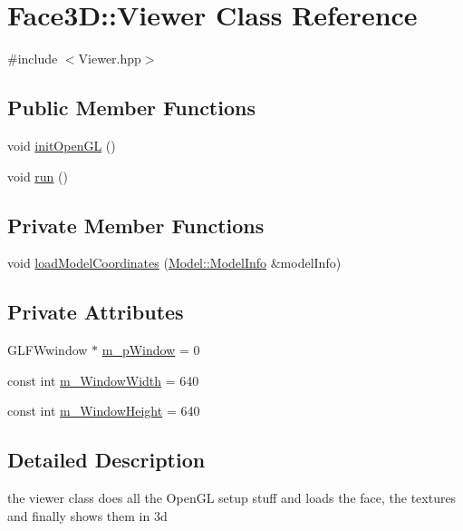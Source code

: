 \hypertarget{class_face3_d_1_1_viewer}{}\section{Face3D\+:\+:Viewer Class Reference}
\label{class_face3_d_1_1_viewer}


{\ttfamily \#include $<$Viewer.\+hpp$>$}

\subsection*{Public Member Functions}
\begin{DoxyCompactItemize}
\item 
void \hyperlink{class_face3_d_1_1_viewer_aa573a82494448874e4ed94f6cd4ed337}{init\+Open\+GL} ()
\item 
void \hyperlink{class_face3_d_1_1_viewer_a044ac30ff04ca0b145753adce39f53f4}{run} ()
\end{DoxyCompactItemize}
\subsection*{Private Member Functions}
\begin{DoxyCompactItemize}
\item 
void \hyperlink{class_face3_d_1_1_viewer_ac4e14d93256535503e5b16866b03f4e1}{load\+Model\+Coordinates} (\hyperlink{struct_face3_d_1_1_model_1_1_model_info}{Model\+::\+Model\+Info} \&model\+Info)
\end{DoxyCompactItemize}
\subsection*{Private Attributes}
\begin{DoxyCompactItemize}
\item 
G\+L\+F\+Wwindow $\ast$ \hyperlink{class_face3_d_1_1_viewer_aa0a9660c0c04a81a2ea3bfdffae5d301}{m\+\_\+p\+Window} = 0
\item 
const int \hyperlink{class_face3_d_1_1_viewer_abf178984caeed65a69fcf7f0073147f4}{m\+\_\+\+Window\+Width} = 640
\item 
const int \hyperlink{class_face3_d_1_1_viewer_ac27129a2e48a533919fad7dc1c307452}{m\+\_\+\+Window\+Height} = 640
\end{DoxyCompactItemize}


\subsection{Detailed Description}
the viewer class does all the Open\+GL setup stuff and loads the face, the textures and finally shows them in 3d 

